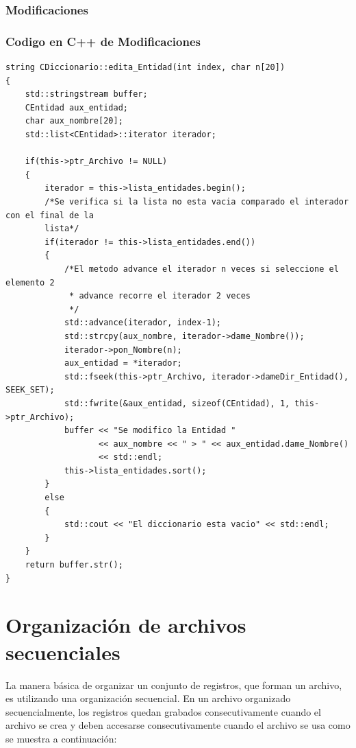 \subsection{Modificaciones}
\newpage
\subsection{Codigo en C++ de Modificaciones}
\begin{lstlisting}[frame=single]
string CDiccionario::edita_Entidad(int index, char n[20])
{
    std::stringstream buffer;
    CEntidad aux_entidad;
    char aux_nombre[20];
    std::list<CEntidad>::iterator iterador;

    if(this->ptr_Archivo != NULL)
    {
        iterador = this->lista_entidades.begin();
        /*Se verifica si la lista no esta vacia comparado el interador con el final de la
        lista*/
        if(iterador != this->lista_entidades.end())
        {
            /*El metodo advance el iterador n veces si seleccione el elemento 2
             * advance recorre el iterador 2 veces
             */
            std::advance(iterador, index-1);
            std::strcpy(aux_nombre, iterador->dame_Nombre());
            iterador->pon_Nombre(n);
            aux_entidad = *iterador;
            std::fseek(this->ptr_Archivo, iterador->dameDir_Entidad(), SEEK_SET);
            std::fwrite(&aux_entidad, sizeof(CEntidad), 1, this->ptr_Archivo);
            buffer << "Se modifico la Entidad "
                   << aux_nombre << " > " << aux_entidad.dame_Nombre()
                   << std::endl;
            this->lista_entidades.sort();
        }
        else
        {
            std::cout << "El diccionario esta vacio" << std::endl;
        }
    }
    return buffer.str();
}
\end{lstlisting}


\chapter[Organización de archivos secuenciales]{Organización de archivos secuenciales}
La manera básica de organizar un conjunto de registros, que forman un archivo, es utilizando una organización secuencial. En un archivo organizado secuencialmente, los  registros quedan grabados consecutivamente cuando el archivo se crea y deben accesarse consecutivamente cuando el archivo se usa como se muestra a continuación:

